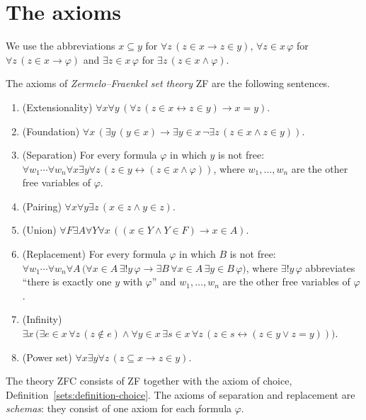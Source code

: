 \section{The axioms}\label{sets:section-axioms}

We use the abbreviations $x \subseteq y$ for $\forall z\,(z \in x \to z \in y)$,
$\forall z \in x\, \varphi$ for $\forall z\,(z \in x \to \varphi)$ and
$\exists z \in x\, \varphi$ for $\exists z\,(z \in x \wedge \varphi)$.

\begin{definition}\label{sets:definition-zfc}
The axioms of \emph{Zermelo--Fraenkel set theory} ZF are the following
sentences.
\begin{enumerate}
\item (Extensionality) $\forall x \forall y\, (\forall z\,(z \in x \leftrightarrow z \in y) \to x = y)$.
\item (Foundation) $\forall x\, (\exists y\, (y \in x) \to \exists y \in x\, \neg\exists z\, (z \in x \wedge z \in y))$.
\item (Separation) For every formula $\varphi$ in which $y$ is not free:
$\forall w_1 \cdots \forall w_n \forall x \exists y \forall z\, (z \in y \leftrightarrow (z \in x \wedge \varphi))$,
where $w_1, \ldots, w_n$ are the other free variables of $\varphi$.
\item (Pairing) $\forall x \forall y \exists z\, (x \in z \wedge y \in z)$.
\item (Union) $\forall F \exists A \forall Y \forall x\, ((x \in Y \wedge Y \in F) \to x \in A)$.
\item (Replacement) For every formula $\varphi$ in which $B$ is not free:
$\forall w_1 \cdots \forall w_n \forall A\, \bigl(\forall x \in A\, \exists! y\, \varphi \to \exists B\, \forall x \in A\, \exists y \in B\, \varphi\bigr)$,
where $\exists! y\, \varphi$ abbreviates ``there is exactly one $y$ with $\varphi$''
and $w_1, \ldots, w_n$ are the other free variables of $\varphi$.
\item (Infinity) $\exists x\, \bigl(\exists e \in x\, \forall z\, (z \notin e) \wedge \forall y \in x\, \exists s \in x\, \forall z\, (z \in s \leftrightarrow (z \in y \vee z = y))\bigr)$.
\item (Power set) $\forall x \exists y \forall z\, (z \subseteq x \to z \in y)$.
\end{enumerate}
The theory ZFC consists of ZF together with the axiom of choice,
Definition~\ref{sets:definition-choice}. The axioms of separation and
replacement are \emph{schemas}: they consist of one axiom for each formula
$\varphi$.
\end{definition}

